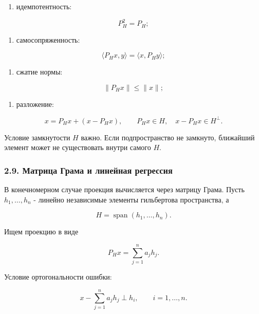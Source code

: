 \documentclass[
  11pt,
  a4paper,
]{article}
\providecommand{\tightlist}{%
  \setlength{\itemsep}{0pt}\setlength{\parskip}{0pt}}
\begin{document}
\begin{enumerate}
\def\labelenumi{\arabic{enumi}.}
\setcounter{enumi}{1}
\tightlist
\item
  идемпотентность:
\end{enumerate}

\[
P_H^2=P_H;
\]

\begin{enumerate}
\def\labelenumi{\arabic{enumi}.}
\setcounter{enumi}{2}
\tightlist
\item
  самосопряженность:
\end{enumerate}

\[
\langle P_Hx,y\rangle=\langle x,P_Hy\rangle;
\]

\begin{enumerate}
\def\labelenumi{\arabic{enumi}.}
\setcounter{enumi}{3}
\tightlist
\item
  сжатие нормы:
\end{enumerate}

\[
\|P_Hx\|\le\|x\|;
\]

\begin{enumerate}
\def\labelenumi{\arabic{enumi}.}
\setcounter{enumi}{4}
\tightlist
\item
  разложение:
\end{enumerate}

\[
x=P_Hx+(x-P_Hx),
\qquad
P_Hx\in H,
\quad
x-P_Hx\in H^\perp.
\]

Условие замкнутости \(H\) важно. Если подпространство не замкнуто,
ближайший элемент может не существовать внутри самого \(H\).

\subsubsection{2.9. Матрица Грама и линейная
регрессия}\label{ux43cux430ux442ux440ux438ux446ux430-ux433ux440ux430ux43cux430-ux438-ux43bux438ux43dux435ux439ux43dux430ux44f-ux440ux435ux433ux440ux435ux441ux441ux438ux44f}

В конечномерном случае проекция вычисляется через матрицу Грама. Пусть
\(h_1,\ldots,h_n\) - линейно независимые элементы гильбертова
пространства, а

\[
H=\operatorname{span}(h_1,\ldots,h_n).
\]

Ищем проекцию в виде

\[
P_Hx=\sum_{j=1}^n a_jh_j.
\]

Условие ортогональности ошибки:

\[
x-\sum_{j=1}^n a_jh_j\perp h_i,
\qquad i=1,\ldots,n.
\]
\end{document}

